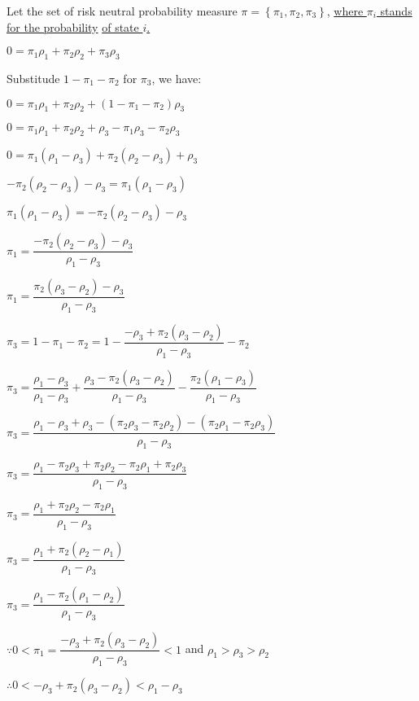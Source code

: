 \documentclass{article}
\begin{document}
Let the set of risk neutral probability measure $\pi=\left\{\pi_{1}, \pi_{2}, \pi_{3}\right\}$, \underline{where $\pi_{i}$ stands for the probability} \underline{of state $i$.}

$0=\pi_{1}\rho_{1}+\pi_{2}\rho_{2}+\pi_{3}\rho_{3}$

Substitude $1-\pi_{1}-\pi_{2}$ for $\pi_{3}$, we have:

$0=\pi_{1}\rho_{1}+\pi_{2}\rho_{2}+\left(1-\pi_{1}-\pi_{2}\right)\rho_{3}$

$0=\pi_{1}\rho_{1}+\pi_{2}\rho_{2}+\rho_{3}-\pi_{1}\rho_{3}-\pi_{2}\rho_{3}$

$0=\pi_{1}\left(\rho_{1}-\rho_{3}\right)+\pi_{2}\left(\rho_{2}-\rho_{3}\right)+\rho_{3}$

$-\pi_{2}\left(\rho_{2}-\rho_{3}\right)-\rho_{3}=\pi_{1}\left(\rho_{1}-\rho_{3}\right)$

$\pi_{1}\left(\rho_{1}-\rho_{3}\right)=-\pi_{2}\left(\rho_{2}-\rho_{3}\right)-\rho_{3}$

$\pi_{1}=\dfrac{-\pi_{2}\left(\rho_{2}-\rho_{3}\right)-\rho_{3}}{\rho_{1}-\rho_{3}}$

$\pi_{1}=\dfrac{\pi_{2}\left(\rho_{3}-\rho_{2}\right)-\rho_{3}}{\rho_{1}-\rho_{3}}$

$\pi_{3}=1-\pi_{1}-\pi_{2}=1-\dfrac{-\rho_{3}+\pi_{2}\left(\rho_{3}-\rho_{2}\right)}{\rho_{1}-\rho_{3}}-\pi_{2}$

$\pi_{3}=\dfrac{\rho_{1}-\rho_{3}}{\rho_{1}-\rho_{3}}+\dfrac{\rho_{3}-\pi_{2}\left(\rho_{3}-\rho_{2}\right)}{\rho_{1}-\rho_{3}}-\dfrac{\pi_{2}\left(\rho_{1}-\rho_{3}\right)}{\rho_{1}-\rho_{3}}$

$\pi_{3}=\dfrac{\rho_{1}-\rho_{3}+\rho_{3}-\left(\pi_{2}\rho_{3}-\pi_{2}\rho_{2}\right)-\left(\pi_{2}\rho_{1}-\pi_{2}\rho_{3}\right)}{\rho_{1}-\rho_{3}}$

$\pi_{3}=\dfrac{\rho_{1}-\pi_{2}\rho_{3}+\pi_{2}\rho_{2}-\pi_{2}\rho_{1}+\pi_{2}\rho_{3}}{\rho_{1}-\rho_{3}}$

$\pi_{3}=\dfrac{\rho_{1}+\pi_{2}\rho_{2}-\pi_{2}\rho_{1}}{\rho_{1}-\rho_{3}}$

$\pi_{3}=\dfrac{\rho_{1}+\pi_{2}\left(\rho_{2}-\rho_{1}\right)}{\rho_{1}-\rho_{3}}$

$\pi_{3}=\dfrac{\rho_{1}-\pi_{2}\left(\rho_{1}-\rho_{2}\right)}{\rho_{1}-\rho_{3}}$

$\because0<\pi_{1}=\dfrac{-\rho_{3}+\pi_{2}\left(\rho_{3}-\rho_{2}\right)}{\rho_{1}-\rho_{3}}<1$ and $\rho_{1}>\rho_{3}>\rho_{2}$

$\therefore0<-\rho_{3}+\pi_{2}\left(\rho_{3}-\rho_{2}\right)<\rho_{1}-\rho_{3}$
\end{document}
